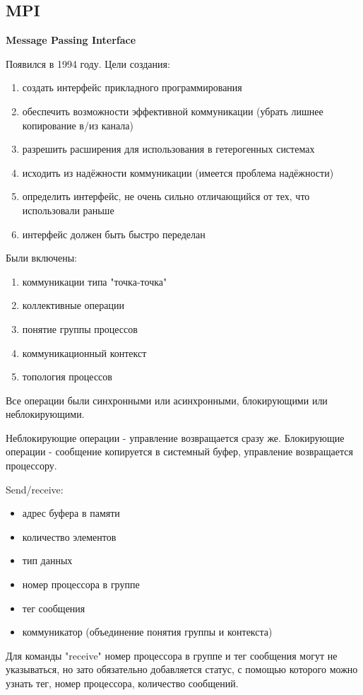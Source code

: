 \documentclass[a4paper,12pt]{article}
\begin{document}
	\subsection{\bf MPI}
	\centerline{\bf Message Passing Interface}
	Появился в 1994 году. Цели создания:
	\begin{enumerate}
		\item создать интерфейс прикладного программирования
		\item обеспечить возможности эффективной коммуникации (убрать лишнее копирование в/из 
		канала)
		\item разрешить расширения для использования в гетерогенных системах
		\item исходить из надёжности коммуникации (имеется проблема надёжности)
		\item определить интерфейс, не очень сильно отличающийся от тех, что использовали раньше
		\item интерфейс должен быть быстро переделан
	\end{enumerate}
	Были включены:
	\begin{enumerate}
		\item коммуникации типа "точка-точка"
		\item коллективные операции
		\item понятие группы процессов
		\item коммуникационный контекст
		\item топология процессов
	\end{enumerate}
	Все операции были синхронными или асинхронными, блокирующими или неблокирующими.
	
	Неблокирующие операции - управление возвращается сразу же. Блокирующие операции - сообщение
копируется в системный буфер, управление возвращается процессору.

	Send/receive:
	\begin{itemize}
		\item адрес буфера в памяти
		\item количество элементов
		\item тип данных
		\item номер процессора в группе
		\item тег сообщения
		\item коммуникатор (объединение понятия группы и контекста)
	\end{itemize}
	Для команды "receive" номер процессора в группе и тег сообщения могут не указываться, но
зато обязательно добавляется статус, с помощью которого можно узнать тег, номер процессора, 
количество сообщений.
	
\end{document}
